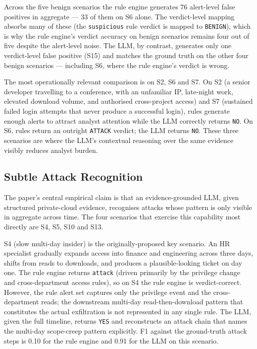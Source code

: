 \documentclass[conference]{IEEEtran}
\begin{document}
Across the five benign scenarios the rule engine generates 76 alert-level false positives in aggregate --- 33 of them on S6 alone. The verdict-level mapping absorbs many of these (the \texttt{suspicious} rule verdict is mapped to \texttt{BENIGN}), which is why the rule engine's verdict accuracy on benign scenarios remains four out of five despite the alert-level noise. The LLM, by contrast, generates only one verdict-level false positive (S15) and matches the ground truth on the other four benign scenarios --- including S6, where the rule engine's verdict is wrong.

The most operationally relevant comparison is on S2, S6 and S7. On S2 (a senior developer travelling to a conference, with an unfamiliar IP, late-night work, elevated download volume, and authorised cross-project access) and S7 (sustained failed login attempts that never produce a successful login), rules generate enough alerts to attract analyst attention while the LLM correctly returns \texttt{NO}. On S6, rules return an outright \texttt{ATTACK} verdict; the LLM returns \texttt{NO}. These three scenarios are where the LLM's contextual reasoning over the same evidence visibly reduces analyst burden.

\subsection{Subtle Attack Recognition}
\label{sec:subtle}

The paper's central empirical claim is that an evidence-grounded LLM, given structured private-cloud evidence, recognises attacks whose pattern is only visible in aggregate across time. The four scenarios that exercise this capability most directly are S4, S5, S10 and S13.

S4 (slow multi-day insider) is the originally-proposed key scenario. An HR specialist gradually expands access into finance and engineering across three days, shifts from reads to downloads, and produces a plausible-looking ticket on day one. The rule engine returns \texttt{attack} (driven primarily by the privilege change and cross-department access rules), so on S4 the rule engine is verdict-correct. However, the rule alert set captures only the privilege event and the cross-department reads; the downstream multi-day read-then-download pattern that constitutes the actual exfiltration is not represented in any single rule. The LLM, given the full timeline, returns \texttt{YES} and reconstructs an attack chain that names the multi-day scope-creep pattern explicitly. F1 against the ground-truth attack steps is 0.10 for the rule engine and 0.91 for the LLM on this scenario.
\end{document}
